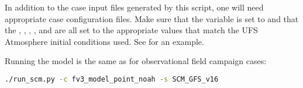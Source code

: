 In addition to the case input files generated by this script, one will need appropriate case configuration files. Make sure that the  variable is set to  and that the , , , , and  are all set to the appropriate values that match the UFS Atmosphere initial conditions used. See  for an example.

Running the model is the same as for observational field campaign cases:
\begin{lstlisting}[language=bash]
./run_scm.py -c fv3_model_point_noah -s SCM_GFS_v16
\end{lstlisting}

